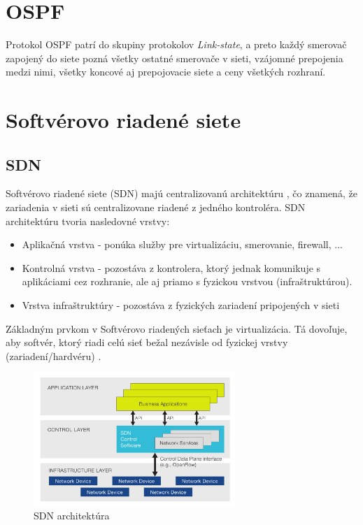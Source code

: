 \documentclass[conference]{IEEEtran}
\begin{document}
\section{OSPF}

Protokol OSPF patrí do skupiny protokolov \textit{Link-state}, a preto každý smerovač zapojený do siete pozná všetky ostatné smerovače v sieti, vzájomné prepojenia medzi nimi, všetky koncové aj prepojovacie siete a ceny všetkých rozhraní.


\section{Softvérovo riadené siete}

\subsection{SDN}
Softvérovo riadené siete (SDN) majú centralizovanú architektúru \cite{second}, čo znamená, že zariadenia v sieti sú centralizovane riadené z jedného kontroléra. SDN architektúru tvoria nasledovné vrstvy:

\begin{itemize}
	\item{Aplikačná vrstva - ponúka služby pre virtualizáciu, smerovanie, firewall, ...}
	\item{Kontrolná vrstva - pozostáva z kontrolera, ktorý jednak komunikuje s aplikáciami cez rozhranie, ale aj priamo s fyzickou vrstvou (infraštruktúrou).}
	\item{Vrstva infraštruktúry - pozostáva z fyzických zariadení pripojených v sieti}
\end{itemize}

Základným prvkom v Softvérovo riadených sieťach je virtualizácia. Tá dovoľuje, aby softvér, ktorý riadi celú sieť bežal nezávisle od fyzickej vrstvy (zariadení/hardvéru) \cite{third}.

\begin{figure}[h!]
\centering
\includegraphics[width=3in]{../img/sdn-architecture}
\caption{SDN architektúra}
\end{figure}
\end{document}
